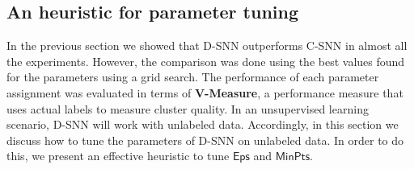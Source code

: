 \documentclass[preprint,12pt,authoryear,review]{elsarticle}
\begin{document}


 

\vspace{-4 mm}
\subsection*{An heuristic for parameter tuning}

In the previous section we showed that D-SNN outperforms C-SNN in almost all the experiments. 
However, the comparison was done using the best values found for the parameters using a grid search. 
The performance of each parameter assignment was evaluated in terms of \textbf{V-Measure}, a performance measure that uses actual labels to measure cluster quality. In an unsupervised learning scenario, D-SNN will work with unlabeled data. Accordingly, in this section we discuss how to tune the parameters of D-SNN on unlabeled data. In order to do this, we present an effective heuristic to tune $\mathsf{Eps}$ and $\mathsf{MinPts}$. 
\end{document}
